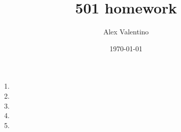 \documentclass[12pt, letterpaper]{article}
\date{\today}
\author{Alex Valentino}
\title{501 homework}
\begin{document}
\begin{enumerate}
	\item
	\item
	\item
	\item
	\item
\end{enumerate}
\end{document}
